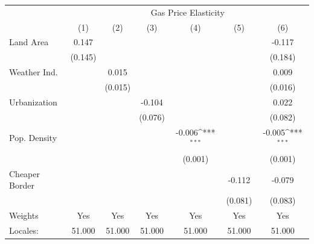 {
\def\sym#1{\ifmmode^{#1}\else\(^{#1}\)\fi}
\begin{tabular}{l*{6}{c}}
\hline\hline
            &\multicolumn{6}{c}{Gas Price Elasticity}                                                                                           \\
            &\multicolumn{1}{c}{(1)}         &\multicolumn{1}{c}{(2)}         &\multicolumn{1}{c}{(3)}         &\multicolumn{1}{c}{(4)}         &\multicolumn{1}{c}{(5)}         &\multicolumn{1}{c}{(6)}         \\
\hline
Land Area   &       0.147         &                     &                     &                     &                     &      -0.117         \\
            &     (0.145)         &                     &                     &                     &                     &     (0.184)         \\
[1em]
Weather Ind.&                     &       0.015         &                     &                     &                     &       0.009         \\
            &                     &     (0.015)         &                     &                     &                     &     (0.016)         \\
[1em]
Urbanization&                     &                     &      -0.104         &                     &                     &       0.022         \\
            &                     &                     &     (0.076)         &                     &                     &     (0.082)         \\
[1em]
Pop. Density&                     &                     &                     &      -0.006\sym{***}&                     &      -0.005\sym{***}\\
            &                     &                     &                     &     (0.001)         &                     &     (0.001)         \\
[1em]
Cheaper Border&                     &                     &                     &                     &      -0.112         &      -0.079         \\
            &                     &                     &                     &                     &     (0.081)         &     (0.083)         \\
\hline
Weights     &         Yes         &         Yes         &         Yes         &         Yes         &         Yes         &         Yes         \\
Locales:    &      51.000         &      51.000         &      51.000         &      51.000         &      51.000         &      51.000         \\
\hline\hline
\end{tabular}
}
